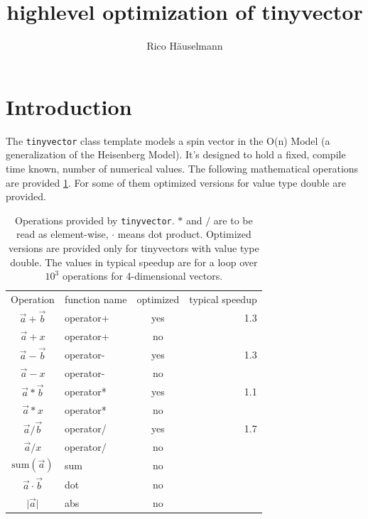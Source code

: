 \documentclass[a4paper]{scrartcl}
\author{Rico H\"auselmann}
\title{highlevel optimization of tinyvector}
\newcommand{\vec}[1]{\overrightarrow{#1}}
\begin{document}
\maketitle
\section*{Introduction}
The \texttt{tinyvector} class template models a spin vector in the O(n) Model (a generalization of the Heisenberg Model). It's designed to hold a fixed, compile time known, number of numerical values.
The following mathematical operations are provided \cref{table:ops}. For some of them optimized versions for value type double are provided.

\begin{table}[h]
    \begin{tabular}{c l c r}
        Operation & function name & optimized & typical speedup\\
        $\vec{a} + \vec{b}$     & operator+ & yes & 1.3 \\
        $\vec{a} + x$           & operator+ & no & \\
        $\vec{a} - \vec{b}$     & operator- & yes & 1.3 \\
        $\vec{a} - x$           & operator- & no & \\
        $\vec{a} * \vec{b}$     & operator* & yes & 1.1 \\
        $\vec{a} * x$           & operator* & no & \\
        $\vec{a} / \vec{b}$     & operator/ & yes & 1.7 \\
        $\vec{a} / x$           & operator/ & no & \\
        $\text{sum}(\vec{a})$   & sum       & no & \\
        $\vec{a} \cdot \vec{b}$ & dot       & no & \\
        $\lvert\vec{a}\rvert$   & abs       & no & \\
    \end{tabular} 
    \caption{\label{table:ops}Operations provided by \texttt{tinyvector}. $*$ and $/$ are to be read as element-wise, $\cdot$ means dot product. Optimized versions are provided only for tinyvectors with value type double. The values in typical speedup are for a loop over $10^3$ operations for 4-dimensional vectors.}
\end{table}
\end{document}
